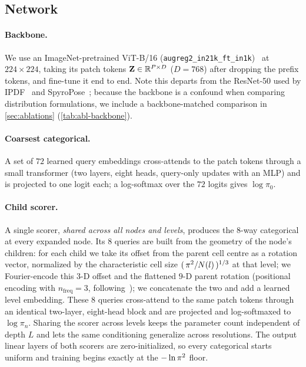 \subsection{Network}
\label{sec:head}

\paragraph{Backbone.}
We use an ImageNet-pretrained ViT-B/16
(\texttt{augreg2\_in21k\_ft\_in1k})~\cite{dosovitskiy2021vit,wightman2019timm}
at $224\times224$, taking its patch tokens
$\mathbf{Z}\in\mathbb{R}^{P\times D}$ ($D=768$) after dropping the prefix tokens, and
fine-tune it end to end. Note this departs from the ResNet-50 used by
IPDF~\cite{murphy2021ipdf} and SpyroPose~\cite{haugaard2023spyropose}; because
the backbone is a confound when comparing distribution formulations, we include
a backbone-matched comparison in \cref{sec:ablations} (\cref{tab:abl-backbone}).

\paragraph{Coarsest categorical.}
A set of $72$ learned query embeddings cross-attends to the patch tokens through
a small transformer (two layers, eight heads, query-only updates with an MLP) and
is projected to one logit each; a log-softmax over the $72$ logits gives
$\log\pi_0$.

\paragraph{Child scorer.}
A single scorer, \emph{shared across all nodes and levels}, produces the $8$-way
categorical at every expanded node. Its $8$ queries are built from the geometry of
the node's children: for each child we take its offset from the parent cell
centre as a rotation vector, normalized by the characteristic cell size
$(\,\pi^2/N(l)\,)^{1/3}$ at that level; we Fourier-encode this $3$-D offset and the
flattened $9$-D parent rotation (positional encoding with $n_\text{freq}=3$,
following~\cite{mildenhall2020nerf}); we concatenate the two and add a learned level embedding.
These $8$ queries cross-attend to the same patch tokens through an identical
two-layer, eight-head block and are projected and log-softmaxed to $\log\pi_n$.
Sharing the scorer across levels keeps the parameter count independent of depth
$L$ and lets the same conditioning generalize across resolutions. The output
linear layers of both scorers are zero-initialized, so every categorical starts
uniform and training begins exactly at the $-\ln\pi^2$ floor.

